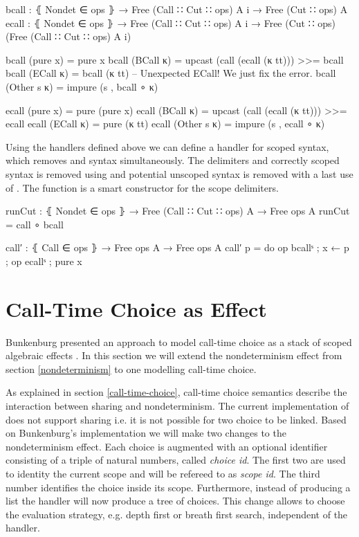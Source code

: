 \begin{code}
bcall : ⦃ Nondet ∈ ops ⦄ → Free (Call ∷ Cut ∷ ops) A {i} → Free (Cut ∷ ops) A
ecall : ⦃ Nondet ∈ ops ⦄ → Free (Call ∷ Cut ∷ ops) A {i}
  → Free (Cut ∷ ops) (Free (Call ∷ Cut ∷ ops) A {i})

bcall (pure x)     = pure x
bcall (BCall κ)    = upcast (call (ecall (κ tt))) >>= bcall
bcall (ECall κ)    = bcall (κ tt) -- Unexpected ECall! We just fix the error.
bcall (Other s κ)  = impure (s , bcall ∘ κ)

ecall (pure x)     = pure (pure x)
ecall (BCall κ)    = upcast (call (ecall (κ tt))) >>= ecall
ecall (ECall κ)    = pure (κ tt)
ecall (Other s κ)  = impure (s , ecall ∘ κ)
\end{code}
Using the handlers defined above we can define a handler for scoped
 syntax, which removes  and
 syntax simultaneously.
The delimiters and correctly scoped  syntax is removed using
 and potential unscoped  syntax is
removed with a last use of .
The function  is a smart constructor for the scope
delimiters.

\begin{code}
runCut : ⦃ Nondet ∈ ops ⦄ → Free (Call ∷ Cut ∷ ops) A → Free ops A
runCut = call ∘ bcall

call′ : ⦃ Call ∈ ops ⦄ → Free ops A → Free ops A
call′ p = do op bcallˢ ; x ← p ; op ecallˢ ; pure x
\end{code}

\section{Call-Time Choice as Effect}

Bunkenburg presented an approach to model call-time choice as a stack of
scoped algebraic effects \cite{bunkenburg2019modeling}.
In this section we will extend the nondeterminism effect from section
\ref{nondeterminism} to one modelling call-time choice.

As explained in section \ref{call-time-choice}, call-time choice semantics
describe the interaction between sharing and nondeterminism.
The current implementation of  does not support sharing
i.e. it is not possible for two choice to be linked.
Based on Bunkenburg's implementation we will make two changes to the
nondeterminism effect.
Each choice is augmented with an optional identifier consisting of a triple of
natural numbers, called \textit{choice id}.
The first two are used to identity the current scope and will be refereed to as
\textit{scope id}.
The third number identifies the choice inside its scope.
Furthermore, instead of producing a list the handler will now produce a tree of
choices.
This change allows to choose the evaluation strategy, e.g. depth first or breath
first search, independent of the handler.


